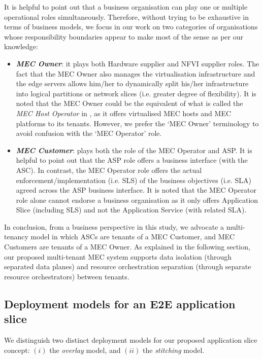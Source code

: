 It is helpful to point out that a business organisation can play one or multiple operational roles simultaneously. Therefore, without trying to be exhaustive in terms of business models, we focus in our work on two categories of organisations whose responsibility boundaries appear to make most of the sense as per our knowledge:
%
\renewcommand\labelitemi{$\bullet$}
\begin{itemize}[noitemsep,topsep=2pt]
    \item \textbf{\textit{MEC Owner}}: it plays both Hardware supplier and NFVI supplier roles. The fact that the MEC Owner also manages the virtualisation infrastructure and the edge servers allows him/her to dynamically split his/her infrastructure into logical partitions or network slices (i.e. greater degree of flexibility). It is noted that the MEC Owner could be the equivalent of what is called the \textit{MEC Host Operator} in \cite{MEC027}, as it offers virtualised MEC hosts and MEC platforms to its tenants. However, we prefer the `MEC Owner' terminology to avoid confusion with the `MEC Operator' role.
    \item \textbf{\textit{MEC Customer}}: plays both the role of the MEC Operator and ASP. It is helpful to point out that the ASP role offers a business interface (with the ASC). In contrast, the MEC Operator role offers the actual enforcement/implementation (i.e. SLS) of the business objectives (i.e. SLA) agreed across the ASP business interface. It is noted that the MEC Operator role alone cannot endorse a business organisation as it only offers Application Slice (including SLS) and not the Application Service (with related SLA). 
\end{itemize}
%
In conclusion, from a business perspective in this study, we advocate a multi-tenancy model in which ASCs are tenants of a MEC Customer, and MEC Customers are tenants of a MEC Owner. As explained in the following section, our proposed multi-tenant MEC system supports data isolation (through separated data planes) and resource orchestration separation (through separate resource orchestrators) between tenants.  
\subsection{Deployment models for an E2E application slice}
\label{subsec:AS_deployment}
\noindent
%
We distinguish two distinct deployment models for our proposed application slice concept: $(i)$ the \textit{overlay} model, and $(ii)$ the \textit{stitching} model. 

